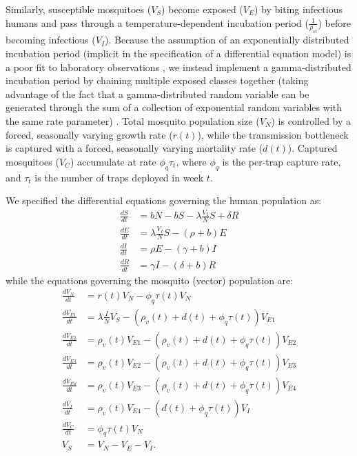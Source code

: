 \documentclass[10pt,letterpaper]{article}
\begin{document}
Similarly, susceptible mosquitoes ($V_S$) become exposed ($V_E$) by biting infectious humans and pass through a temperature-dependent incubation period ($\frac{1}{\rho_{vt}}$) before becoming infectious ($V_I$).
Because the assumption of an exponentially distributed incubation period (implicit in the specification of a differential equation model) is a poor fit to laboratory observations \cite{Chan2012}, we instead implement a gamma-distributed incubation period by chaining multiple exposed classes together (taking advantage of the fact that a gamma-distributed random variable can be generated through the sum of a collection of exponential random variables with the same rate parameter) \cite{Lloyd2001}.
Total mosquito population size ($V_N$) is controlled by a forced, seasonally varying growth rate ($r(t)$), while the transmission bottleneck is captured with a forced, seasonally varying mortality rate ($d(t)$).
Captured mosquitoes ($V_C$) accumulate at rate $\phi_q \tau_t$, where $\phi_q$ is the per-trap capture rate, and $\tau_t$ is the number of traps deployed in week $t$.

We specified the differential equations governing the human population as:
\begin{align} 
\frac{dS}{dt} &= bN - bS - \lambda \frac{V_{I}}{N} S + \delta R\\
\frac{dE}{dt} &= \lambda \frac{V_{I}}{N} S - (\rho + b)E\\
\frac{dI}{dt} &= \rho E - (\gamma + b)I\\
\frac{dR}{dt} &= \gamma I - (\delta + b)R
\end{align}
while the equations governing the mosquito (vector) population are:
\begin{align}
\frac{dV_N}{dt} & = r(t) V_N - \phi_q \tau(t) V_N \\
\frac{dV_{E1}}{dt} &= \lambda \frac{I}{N} V_S - (\rho_{v}(t) + d(t) + \phi_q \tau(t))V_{E1}\\
\frac{dV_{E2}}{dt} &= \rho_{v}(t) V_{E1} - (\rho_{v}(t) + d(t) + \phi_q \tau(t))V_{E2}\\
\frac{dV_{E3}}{dt} &= \rho_{v}(t) V_{E2}  - (\rho_{v}(t) + d(t) + \phi_q \tau(t))V_{E3}\\
\frac{dV_{E4}}{dt} &= \rho_{v}(t) V_{E3}  - (\rho_{v}(t) + d(t) + \phi_q \tau(t))V_{E4}\\
\frac{dV_I}{dt} &= \rho_{v}(t) V_{E4} - (d(t) + \phi_q \tau(t)) V_I\\
\frac{dV_C}{dt} & = \phi_q \tau(t) V_N\\
V_S &= V_N - V_E - V_I.
\end{align}
\end{document}
